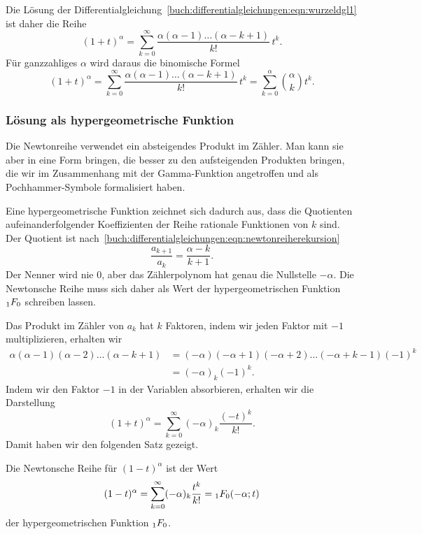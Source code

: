 Die Lösung der 
Differentialgleichung~\eqref{buch:differentialgleichungen:eqn:wurzeldgl1}
ist daher die Reihe
\begin{equation}
(1+t)^\alpha
=
\sum_{k=0}^\infty
\frac{\alpha(\alpha-1)\dots(\alpha-k+1)}{k!}\, t^k.
\label{buch:differentialgleichungen:eqn:newtonreihe}
\end{equation}
Für ganzzahliges $\alpha$ wird daraus die binomische Formel
\[
(1+t)^\alpha
=
\sum_{k=0}^\infty
\frac{\alpha(\alpha-1)\dots(\alpha-k+1)}{k!}\, t^k
=
\sum_{k=0}^\alpha \binom{\alpha}{k} t^k.
\]

%
%
\subsubsection{Lösung als hypergeometrische Funktion}
Die Newtonreihe verwendet ein absteigendes Produkt im Zähler.
Man kann sie aber in eine Form bringen, die besser zu den aufsteigenden
Produkten bringen, die wir im Zusammenhang mit der Gamma-Funktion
angetroffen und als Pochhammer-Symbole formalisiert haben.

Eine hypergeometrische Funktion zeichnet sich dadurch aus, dass
die Quotienten aufeinanderfolgender Koeffizienten der Reihe rationale
Funktionen von $k$ sind.
Der Quotient ist
nach~\eqref{buch:differentialgleichungen:eqn:newtonreiherekursion}
\[
\frac{a_{k+1}}{a_k}
=
\frac{\alpha-k}{k+1}.
\]
Der Nenner wird nie $0$, aber das Zählerpolynom hat genau die Nullstelle
$-\alpha$.
Die Newtonsche Reihe muss sich daher als Wert der hypergeometrischen
Funktion $\mathstrut_1F_0$ schreiben lassen.

Das Produkt im Zähler von $a_k$ hat $k$ Faktoren, indem wir jeden Faktor
mit $-1$ multiplizieren, erhalten wir
\begin{align*}
\alpha(\alpha-1)(\alpha-2)\dots(\alpha-k+1)
&=
(-\alpha)(-\alpha+1)(-\alpha+2)\dots(-\alpha+k-1) (-1)^k
\\
&=
(-\alpha)_k (-1)^k.
\end{align*}
Indem wir den Faktor $-1$ in der Variablen absorbieren, erhalten
wir die Darstellung
\[
(1+t)^\alpha
=
\sum_{k=0}^\infty
(-\alpha)_k\frac{(-t)^k}{k!}.
\]
Damit haben wir den folgenden Satz gezeigt.

\begin{satz}
Die Newtonsche Reihe für $(1-t)^\alpha$ ist der Wert
\[
(1-t)^\alpha
=
\sum_{k=0}^\infty (-\alpha)_k \frac{t^k}{k!}
=
\mathstrut_1F_0(-\alpha;t)
\]
der hypergeometrischen Funktion $\mathstrut_1F_0$.
\end{satz}

